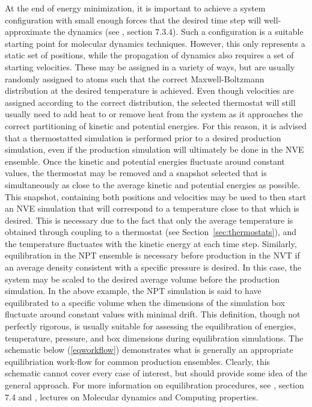 \documentclass[9pt,bestpractices]{livecoms}
\begin{document}
At the end of energy minimization, it is important to achieve a system configuration with small enough forces that the desired time step will well-approximate the dynamics (see \citet{LeachBook}, section 7.3.4).
Such a configuration is a suitable starting point for molecular dynamics techniques.
However, this only represents a static set of positions, while the propagation of dynamics also requires a set of starting velocities.
These may be assigned in a variety of ways, but are usually randomly assigned to atoms such that the correct Maxwell-Boltzmann distribution at the desired temperature is achieved.
Even though velocities are assigned according to the correct distribution, the selected thermostat will still usually need to add heat to or remove heat from the system as it approaches the correct partitioning of kinetic and potential energies.
For this reason, it is advised that a thermostatted simulation is performed prior to a desired production simulation, even if the production simulation will ultimately be done in the NVE ensemble.
Once the kinetic and potential energies fluctuate around constant values, the thermostat may be removed and a snapshot selected that is simultaneously as close to the average kinetic and potential energies as possible.
This snapshot, containing both positions and velocities may be used to then start an NVE simulation that will correspond to a temperature close to that which is desired.
This is necessary due to the fact that only the average temperature is obtained through coupling to a thermostat (see Section~\ref{sec:thermostats}), and the temperature fluctuates with the kinetic energy at each time step.
Similarly, equilibration in the NPT ensemble is necessary before production in the NVT if an average density consistent with a specific pressure is desired.
In this case, the system may be scaled to the desired average volume before the production simulation.
In the above example, the NPT simulation is said to have equilibrated to a specific volume when the dimensions of the simulation box fluctuate around constant values with minimal drift. 
This definition, though not perfectly rigorous, is usually suitable for assessing the equilibration of energies, temperature, pressure, and box dimensions during equilibration simulations.
The schematic below (\ref{eqworkflow}) demonstrates what is generally an appropriate equilibriation work-flow for common production ensembles.
Clearly, this schematic cannot cover every case of interest, but should provide some idea of the general approach.
For more information on equilibration procedures, see \citet{LeachBook}, section 7.4 and \citet{ShellNotes}, lectures on Molecular dynamics and Computing properties.
\end{document}
